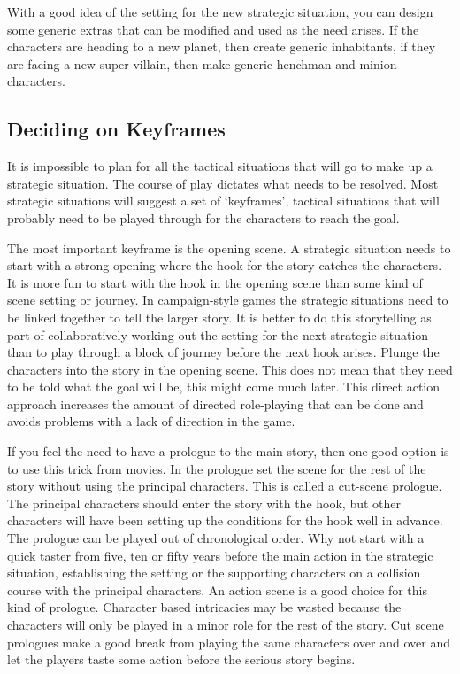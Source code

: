 \documentclass[twoside]{book}
\begin{document}
With a good idea of the setting for the new strategic situation, you
can design some generic extras that can be modified and used as the
need arises. If the characters are heading to a new planet, then
create generic inhabitants, if they are facing a new super-villain,
then make generic henchman and minion characters.

\subsection{Deciding on Keyframes}

It is impossible to plan for all the tactical situations that will go
to make up a strategic situation. The course of play dictates what
needs to be resolved. Most strategic situations will suggest a set of
`keyframes', tactical situations that will probably need to be played
through for the characters to reach the goal.

The most important keyframe is the opening scene. A strategic
situation needs to start with a strong opening where the hook for the
story catches the characters. It is more fun to start with the hook in
the opening scene than some kind of scene setting or journey. In
campaign-style games the strategic situations need to be linked
together to tell the larger story. It is better to do this
storytelling as part of collaboratively working out the setting for
the next strategic situation than to play through a block of journey
before the next hook arises. Plunge the characters into the story in
the opening scene. This does not mean that they need to be told what
the goal will be, this might come much later. This direct action
approach increases the amount of directed role-playing that can be
done and avoids problems with a lack of direction in the game.

If you feel the need to have a prologue to the main story, then one
good option is to use this trick from movies. In the prologue set the
scene for the rest of the story without using the principal
characters. This is called a cut-scene prologue. The principal
characters should enter the story with the hook, but other characters
will have been setting up the conditions for the hook well in
advance. The prologue can be played out of chronological order. Why
not start with a quick taster from five, ten or fifty years before the
main action in the strategic situation, establishing the setting or
the supporting characters on a collision course with the principal
characters. An action scene is a good choice for this kind of
prologue. Character based intricacies may be wasted because the
characters will only be played in a minor role for the rest of the
story. Cut scene prologues make a good break from playing the same
characters over and over and let the players taste some action before
the serious story begins.
\end{document}
